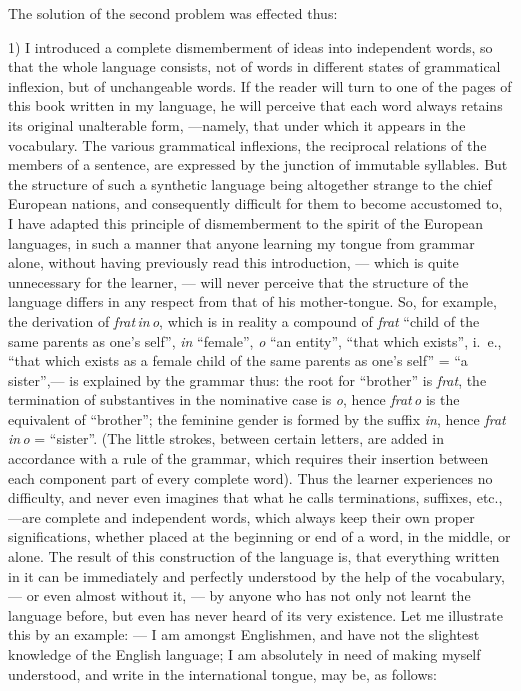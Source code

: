 
The solution of the second problem was effected thus:

1) I introduced a complete dismemberment of ideas into independent words, so that the whole language consists, not of words in different states of grammatical inflexion, but of unchangeable words. If the reader will turn to one of the pages of this book written in my language, he will perceive that each word always retains its original unalterable form, ---namely, that under which it appears in the vocabulary. The various grammatical inflexions, the reciprocal relations of the members of a sentence, are expressed by the junction of immutable syllables. But the structure of such a synthetic language being altogether strange to the chief European nations, and consequently difficult for them to become accustomed to, I have adapted this principle of dismemberment to the spirit of the European languages, in such a manner that anyone learning my tongue from grammar alone, without having previously read this introduction, --- which is quite unnecessary for the learner, --- will never perceive that the structure of the language differs in any respect from that of his mother-tongue. So, for example, the derivation of \emph{frat\,in\,o}, which is in reality a compound of \emph{frat} “child of the same parents as one’s self”, \emph{in} “female”, \emph{o} “an entity”, “that which exists”, i.~e., “that which exists as a female child of the same parents as one’s self” = “a sister”,--- is explained by the grammar thus: the root for “brother” is \emph{frat}, the termination of substantives in the nominative case is \emph{o}, hence \emph{frat\,o} is the equivalent of “brother”; the feminine gender is formed by the suffix \emph{in}, hence \emph{frat\,in\,o} = “sister”. (The little strokes, between certain letters, are added in accordance with a rule of the grammar, which requires their insertion between each component part of every complete word). Thus the learner experiences no difficulty, and never even imagines that what he calls terminations, suffixes, etc.,---are complete and independent words, which always keep their own proper significations, whether placed at the beginning or end of a word, in the middle, or alone. The result of this construction of the language is, that everything written in it can be immediately and perfectly understood by the help of the vocabulary, --- or even almost without it, --- by anyone who has not only not learnt the language before, but even has never heard of its very existence. Let me illustrate this by an example: --- I am amongst Englishmen, and have not the slightest knowledge of the English language; I am absolutely in need of making myself understood, and write in the international tongue, may be, as follows:


